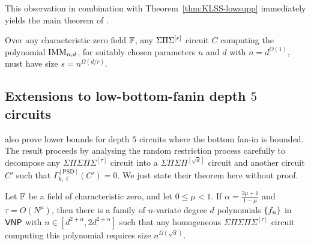 This observation in combination with Theorem~\ref{thm:KLSS-lowsupp} immediately yields the main theorem of \cite{KayalSaha14}. 

\begin{theorem}\label{thm:kaysaha-main}
Over any characteristic zero field $\mathbb{F}$, any $\Sigma\Pi\Sigma^{[r]}$ circuit $C$ computing the polynomial $\mathrm{IMM}_{n,d}$, for suitably chosen parameters $n$ and $d$ with $n = d^{O(1)}$, must have size $s = n^{\Omega(d/r)}$. 
\end{theorem}

\subsection{Extensions to low-bottom-fanin depth $5$ circuits}

\cite{KayalSaha14} also prove lower bounds for depth $5$ circuits where the bottom fan-in is bounded. The result proceeds by analysing the random restriction process carefully to decompose any $\Sigma\Pi\Sigma\Pi\Sigma^{[\tau]}$ circuit into a $\Sigma\Pi\Sigma\Pi^{[\sqrt{d}]}$ circuit and another circuit $C'$ such that $\Gamma_{k,\ell}^{[\mathrm{PSD}]}(C') = 0$. We just state their theorem here without proof. 

\begin{theorem}\label{thm:kaysaha-d5}
Let $\mathbb{F}$ be a field of characteristic zero, and let $0\leq \mu < 1$. If $\alpha  = \frac{2\mu + 1}{1 - \mu}$ and $\tau = O(N^\mu)$, then there is a family of $n$-variate degree $d$ polynomials $\left\{f_n\right\}$ in $\mathsf{VNP}$ with $n\in [d^{2+\alpha}, 2d^{2+\alpha}]$ such that any homogeneous $\Sigma\Pi\Sigma\Pi\Sigma^{[\tau]}$ circuit computing this polynomial requires size $n^{\Omega(\sqrt{d})}$. 
\end{theorem}



